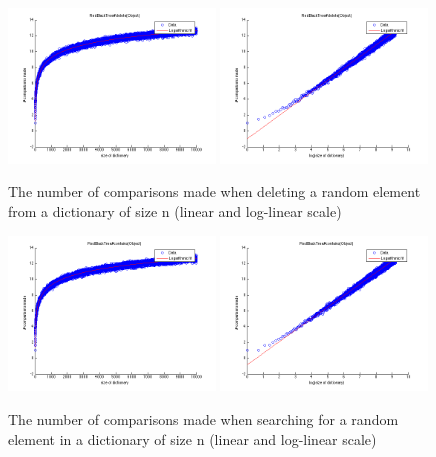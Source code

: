 \begin{figure}[!htbp]
    \centering
    \includegraphics[width=0.49\textwidth]{resources/del}
    \includegraphics[width=0.49\textwidth]{resources/del_log}
    \caption{The number of comparisons made when deleting a random element from a dictionary of size n (linear and log-linear scale)}
\end{figure}

\begin{figure}[!htbp]
    \centering
    \includegraphics[width=0.49\textwidth]{resources/search}
    \includegraphics[width=0.49\textwidth]{resources/search_log}
    \caption{The number of comparisons made when searching for a random element in a dictionary of size n (linear and log-linear scale)}
\end{figure}

